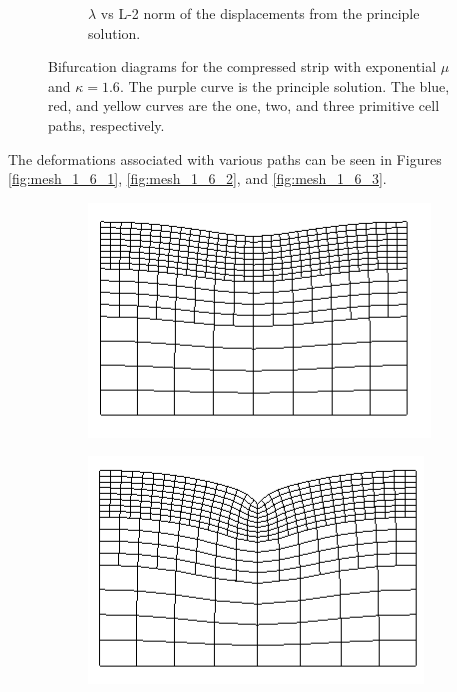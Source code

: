 \documentclass[11pt]{report}
\begin{document}
\begin{figure}[!htb]
\begin{subfigure}[b]{0.5\textwidth}
		\caption{$\lambda$ vs L-2 norm of the displacements from the principle solution. }
		\label{fig:bif_diagram_1_6_disp}
	\end{subfigure}
	\captionsetup{format=hang}
	\caption{Bifurcation diagrams for the compressed strip with exponential $\mu$ and $\kappa = 1.6$. The purple curve is the principle solution. The blue, red, and yellow curves are the one, two, and three primitive cell paths, respectively.}
    \label{fig:bif_diagram_1_6_0}
\end{figure}
The deformations associated with various paths can be seen in Figures \ref{fig:mesh_1_6_1}, \ref{fig:mesh_1_6_2}, and \ref{fig:mesh_1_6_3}.
\begin{figure}[!htb]
	\begin{subfigure}[b]{0.33\textwidth}
		\includegraphics[width=\textwidth]{mesh/mesh_1_6_1_low}
	\end{subfigure}
	\begin{subfigure}[b]{0.33\textwidth}
		\includegraphics[width=\textwidth]{mesh/mesh_1_6_1_med}

\end{subfigure}
\end{figure}
\end{document}
